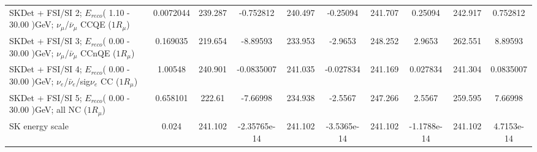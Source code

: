 \begin{tabular}{| l | S | S  S | S  S | S  S | S  S | }
SKDet + FSI/SI  2; $E_{reco}$( 1.10 - 30.00 )GeV; $\nu_{\mu}$/$\bar{\nu}_{\mu}$ CCQE ($1R_{\mu}$) &       0.0072044 &         239.287 &       -0.752812 &         240.497 &        -0.25094 &         241.707 &         0.25094 &         242.917 &        0.752812 \\ 
SKDet + FSI/SI  3; $E_{reco}$( 0.00 - 30.00 )GeV; $\nu_{\mu}$/$\bar{\nu}_{\mu}$ CCnQE ($1R_{\mu}$) &        0.169035 &         219.654 &        -8.89593 &         233.953 &         -2.9653 &         248.252 &          2.9653 &         262.551 &         8.89593 \\ 
SKDet + FSI/SI  4; $E_{reco}$( 0.00 - 30.00 )GeV; $\nu_{e}$/$\bar{\nu}_{e}$/sig$\nu_{e}$ CC ($1R_{\mu}$) &         1.00548 &         240.901 &      -0.0835007 &         241.035 &       -0.027834 &         241.169 &        0.027834 &         241.304 &       0.0835007 \\ 
           SKDet + FSI/SI  5; $E_{reco}$( 0.00 - 30.00 )GeV; all NC ($1R_{\mu}$) &        0.658101 &          222.61 &        -7.66998 &         234.938 &         -2.5567 &         247.266 &          2.5567 &         259.595 &         7.66998 \\ 
                                                                 SK energy scale &           0.024 &         241.102 &    -2.35765e-14 &         241.102 &     -3.5365e-14 &         241.102 &     -1.1788e-14 &         241.102 &      4.7153e-14 \\ 
\bottomrule
\end{tabular}
